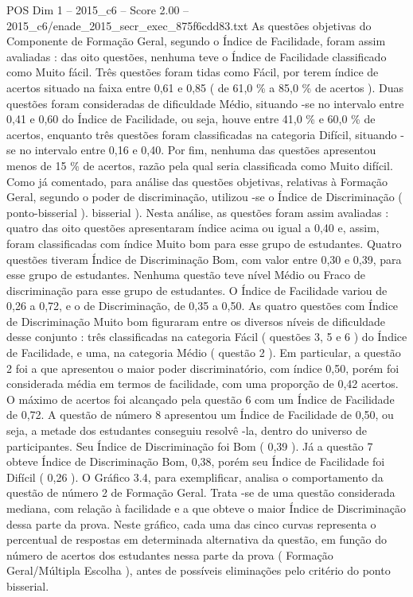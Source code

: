 \begin{textsample}{POS Dim 1 – 2015\_c6 – Score 2.00 – 2015\_c6/enade\_2015\_secr\_exec\_875f6cdd83.txt}
As questões objetivas do Componente de Formação Geral, segundo o Índice de Facilidade, foram assim avaliadas : das oito questões, nenhuma teve o Índice de Facilidade classificado como Muito fácil.
Três questões foram tidas como Fácil, por terem índice de acertos situado na faixa entre 0,61 e 0,85 ( de 61,0 \% a 85,0 \% de acertos ).
Duas questões foram consideradas de dificuldade Médio, situando -se no intervalo entre 0,41 e 0,60 do Índice de Facilidade, ou seja, houve entre 41,0 \% e 60,0 \% de acertos, enquanto três questões foram classificadas na categoria Difícil, situando -se no intervalo entre 0,16 e 0,40.
Por fim, nenhuma das questões apresentou menos de 15 \% de acertos, razão pela qual seria classificada como Muito difícil.
Como já comentado, para análise das questões objetivas, relativas à Formação Geral, segundo o poder de discriminação, utilizou -se o Índice de Discriminação ( ponto-bisserial ). bisserial ).
Nesta análise, as questões foram assim avaliadas : quatro das oito questões apresentaram índice acima ou igual a 0,40 e, assim, foram classificadas com índice Muito bom para esse grupo de estudantes.
Quatro questões tiveram Índice de Discriminação Bom, com valor entre 0,30 e 0,39, para esse grupo de estudantes.
Nenhuma questão teve nível Médio ou Fraco de discriminação para esse grupo de estudantes.
O Índice de Facilidade variou de 0,26 a 0,72, e o de Discriminação, de 0,35 a 0,50.
As quatro questões com Índice de Discriminação Muito bom figuraram entre os diversos níveis de dificuldade desse conjunto : três classificadas na categoria Fácil ( questões 3, 5 e 6 ) do Índice de Facilidade, e uma, na categoria Médio ( questão 2 ).
Em particular, a questão 2 foi a que apresentou o maior poder discriminatório, com índice 0,50, porém foi considerada média em termos de facilidade, com uma proporção de 0,42 acertos.
O máximo de acertos foi alcançado pela questão 6 com um Índice de Facilidade de 0,72.
A questão de número 8 apresentou um Índice de Facilidade de 0,50, ou seja, a metade dos estudantes conseguiu resolvê -la, dentro do universo de participantes.
Seu Índice de Discriminação foi Bom ( 0,39 ).
Já a questão 7 obteve Índice de Discriminação Bom, 0,38, porém seu Índice de Facilidade foi Difícil ( 0,26 ).
O Gráfico 3.4, para exemplificar, analisa o comportamento da questão de número 2 de Formação Geral.
Trata -se de uma questão considerada mediana, com relação à facilidade e a que obteve o maior Índice de Discriminação dessa parte da prova.
Neste gráfico, cada uma das cinco curvas representa o percentual de respostas em determinada alternativa da questão, em função do número de acertos dos estudantes nessa parte da prova ( Formação Geral/Múltipla Escolha ), antes de possíveis eliminações pelo critério do ponto bisserial.

\end{textsample}
